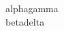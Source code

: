 \documentclass{amsart}
\begin{document}
\noindent
alpha\phantom{beta}gamma\\
\phantom{alpha}beta\phantom{gamma}delta
\end{document}
